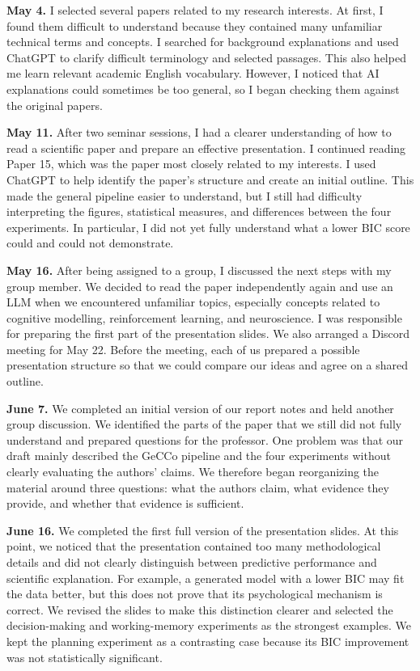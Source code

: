 \textbf{May 4.} I selected several papers related to my research interests. At first, I found them difficult to understand because they contained many unfamiliar technical terms and concepts. I searched for background explanations and used ChatGPT to clarify difficult terminology and selected passages. This also helped me learn relevant academic English vocabulary. However, I noticed that AI explanations could sometimes be too general, so I began checking them against the original papers.
 
\textbf{May 11.} After two seminar sessions, I had a clearer understanding of how to read a scientific paper and prepare an effective presentation. I continued reading Paper 15, which was the paper most closely related to my interests. I used ChatGPT to help identify the paper's structure and create an initial outline. This made the general pipeline easier to understand, but I still had difficulty interpreting the figures, statistical measures, and differences between the four experiments. In particular, I did not yet fully understand what a lower BIC score could and could not demonstrate.
 
\textbf{May 16.} After being assigned to a group, I discussed the next steps with my group member. We decided to read the paper independently again and use an LLM when we encountered unfamiliar topics, especially concepts related to cognitive modelling, reinforcement learning, and neuroscience. I was responsible for preparing the first part of the presentation slides. We also arranged a Discord meeting for May 22. Before the meeting, each of us prepared a possible presentation structure so that we could compare our ideas and agree on a shared outline.
 
\textbf{June 7.} We completed an initial version of our report notes and held another group discussion. We identified the parts of the paper that we still did not fully understand and prepared questions for the professor. One problem was that our draft mainly described the GeCCo pipeline and the four experiments without clearly evaluating the authors' claims. We therefore began reorganizing the material around three questions: what the authors claim, what evidence they provide, and whether that evidence is sufficient.
 
\textbf{June 16.} We completed the first full version of the presentation slides. At this point, we noticed that the presentation contained too many methodological details and did not clearly distinguish between predictive performance and scientific explanation. For example, a generated model with a lower BIC may fit the data better, but this does not prove that its psychological mechanism is correct. We revised the slides to make this distinction clearer and selected the decision-making and working-memory experiments as the strongest examples. We kept the planning experiment as a contrasting case because its BIC improvement was not statistically significant.
 
